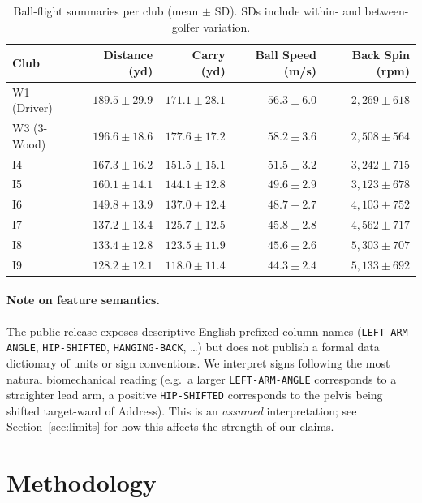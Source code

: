 \documentclass[11pt,a4paper]{article}
\begin{document}
\begin{table}[t]
\centering
\small
\caption{Ball-flight summaries per club (mean $\pm$ SD).  SDs include within- and between-golfer variation.}
\label{tab:clubs}
\begin{tabular}{lrrrr}
\toprule
\textbf{Club} & \textbf{Distance (yd)} & \textbf{Carry (yd)} & \textbf{Ball Speed (m/s)} & \textbf{Back Spin (rpm)} \\
\midrule
W1 (Driver)  & $189.5 \pm 29.9$ & $171.1 \pm 28.1$ & $56.3 \pm 6.0$ & $2{,}269 \pm 618$ \\
W3 (3-Wood)  & $196.6 \pm 18.6$ & $177.6 \pm 17.2$ & $58.2 \pm 3.6$ & $2{,}508 \pm 564$ \\
I4           & $167.3 \pm 16.2$ & $151.5 \pm 15.1$ & $51.5 \pm 3.2$ & $3{,}242 \pm 715$ \\
I5           & $160.1 \pm 14.1$ & $144.1 \pm 12.8$ & $49.6 \pm 2.9$ & $3{,}123 \pm 678$ \\
I6           & $149.8 \pm 13.9$ & $137.0 \pm 12.4$ & $48.7 \pm 2.7$ & $4{,}103 \pm 752$ \\
I7           & $137.2 \pm 13.4$ & $125.7 \pm 12.5$ & $45.8 \pm 2.8$ & $4{,}562 \pm 717$ \\
I8           & $133.4 \pm 12.8$ & $123.5 \pm 11.9$ & $45.6 \pm 2.6$ & $5{,}303 \pm 707$ \\
I9           & $128.2 \pm 12.1$ & $118.0 \pm 11.4$ & $44.3 \pm 2.4$ & $5{,}133 \pm 692$ \\
\bottomrule
\end{tabular}
\end{table}

\paragraph{Note on feature semantics.}
The public release exposes descriptive English-prefixed column names (\texttt{LEFT-ARM-ANGLE},
\texttt{HIP-SHIFTED}, \texttt{HANGING-BACK}, \dots) but does not publish a formal data dictionary of units or
sign conventions.  We interpret signs following the most natural biomechanical reading (e.g.\ a larger
\texttt{LEFT-ARM-ANGLE} corresponds to a straighter lead arm, a positive \texttt{HIP-SHIFTED} corresponds to the
pelvis being shifted target-ward of Address).  This is an \emph{assumed} interpretation; see
Section~\ref{sec:limits} for how this affects the strength of our claims.

\section{Methodology}
\label{sec:method}
\end{document}
